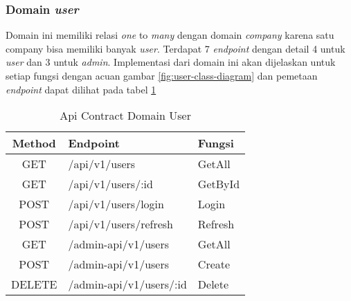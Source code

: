 \subsubsection{Domain \textit{user}}

Domain ini memiliki relasi \textit{one} to \textit{many} dengan domain \textit{company} karena satu company bisa memiliki banyak \textit{user}. Terdapat 7 \textit{endpoint} dengan detail 4 untuk \textit{user} dan 3 untuk \textit{admin}. Implementasi dari domain ini akan dijelaskan untuk setiap fungsi dengan acuan gambar \ref{fig:user-class-diagram} dan pemetaan \textit{endpoint} dapat dilihat pada tabel \ref{tab:api-contract-domain-user}

\bgroup
\begin{table}[ht]
  \caption{Api Contract Domain User}
  \label{tab:api-contract-domain-user}
  \def\arraystretch{1.7}
  \centering
  \begin{tabular}{|c|p{6cm}|p{4cm}|}
    \hline
    Method & Endpoint                &
    Fungsi                                     \\
    \hline
    GET    & /api/v1/users           & GetAll  \\
    \hline
    GET    & /api/v1/users/:id       & GetById \\
    \hline
    POST   & /api/v1/users/login     & Login   \\
    \hline
    POST   & /api/v1/users/refresh   & Refresh \\
    \hline
    GET    & /admin-api/v1/users     & GetAll  \\
    \hline
    POST   & /admin-api/v1/users     & Create  \\
    \hline
    DELETE & /admin-api/v1/users/:id & Delete  \\
    \hline
  \end{tabular}
\end{table}
\egroup


